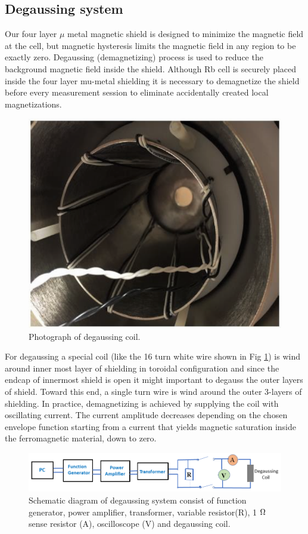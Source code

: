 \subsection{Degaussing system\label{sec:Degaussing}}
Our four layer $\mu$ metal magnetic shield is designed to minimize the magnetic field at the cell, but
magnetic hysteresis limits the magnetic field in any region to be exactly zero. Degaussing (demagnetizing) process is used to reduce the background magnetic field inside the shield. Although Rb cell is securely placed inside the four layer mu-metal shielding it is necessary to demagnetize the shield before every measurement session  to eliminate accidentally created local magnetizations.
\begin{figure}%
\centering
\includegraphics[width=0.6\linewidth]{figures/degaussing_coil.png}
\caption{Photograph of degaussing coil.\label{fig:degaussing_ccoil.}}
\end{figure}
 For degaussing a special coil (like the 16 turn white wire  shown in Fig \ref{fig:degaussing_ccoil.}) is wind around inner most layer of shielding  in toroidal configuration
and  since the endcap of innermost shield is open it might important to degauss the outer layers of shield. Toward this end, a single turn wire is wind around the outer 3-layers of shielding.
In practice, demagnetizing is achieved  by supplying the coil with oscillating current. The current amplitude decreases depending on the chosen envelope function starting from a current that yields magnetic saturation inside the ferromagnetic material, down to zero. 
\begin{figure}[h]
\centering
\includegraphics[width=1.0\linewidth]{figures/degaussing_system}
\caption{Schematic diagram of degaussing system consist of function generator, power amplifier, transformer, variable resistor(R), 1 $\ohm$ sense resistor (A), oscilloscope (V) and degaussing coil. \label{fig:schematic-of-degaussing_system.}}
\end{figure}

